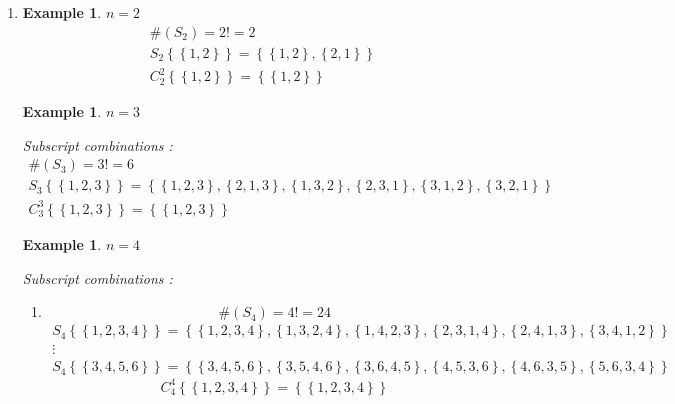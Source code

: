 \documentclass[aps,preprint]{revtex4}%
\newtheorem{example}[theorem]{Example}
\begin{document}
\begin{enumerate}
\item
\begin{example}
$n=2$%
\begin{gather}
\#\left(  S_{2}\right)  =2!=2\\
S_{2}\left\{  \left\{  1,2\right\}  \right\}  =\left\{  \left\{  1,2\right\}
,\left\{  2,1\right\}  \right\} \\
C_{2}^{2}\left\{  \left\{  1,2\right\}  \right\}  =\left\{  \left\{
1,2\right\}  \right\}
\end{gather}

\end{example}

\begin{example}
$n=3$

Subscript combinations :%
\begin{gather}
\#\left(  S_{3}\right)  =3!=6\\
S_{3}\left\{  \left\{  1,2,3\right\}  \right\}  =\left\{  \left\{
1,2,3\right\}  ,\left\{  2,1,3\right\}  ,\left\{  1,3,2\right\}  ,\left\{
2,3,1\right\}  ,\left\{  3,1,2\right\}  ,\left\{  3,2,1\right\}  \right\} \\
C_{3}^{3}\left\{  \left\{  1,2,3\right\}  \right\}  =\left\{  \left\{
1,2,3\right\}  \right\}
\end{gather}

\end{example}

\begin{example}
$n=4$

Subscript combinations :

\begin{enumerate}
\item
\begin{equation}
\#\left(  S_{4}\right)  =4!=24
\end{equation}%
\begin{gather}
S_{4}\left\{  \left\{  1,2,3,4\right\}  \right\}  =\left\{  \left\{
1,2,3,4\right\}  ,\left\{  1,3,2,4\right\}  ,\left\{  1,4,2,3\right\}
,\left\{  2,3,1,4\right\}  ,\left\{  2,4,1,3\right\}  ,\left\{
3,4,1,2\right\}  \right\} \\
\vdots\\
S_{4}\left\{  \left\{  3,4,5,6\right\}  \right\}  =\left\{  \left\{
3,4,5,6\right\}  ,\left\{  3,5,4,6\right\}  ,\left\{  3,6,4,5\right\}
,\left\{  4,5,3,6\right\}  ,\left\{  4,6,3,5\right\}  ,\left\{
5,6,3,4\right\}  \right\}
\end{gather}%
\begin{equation}
C_{4}^{4}\left\{  \left\{  1,2,3,4\right\}  \right\}  =\left\{  \left\{
1,2,3,4\right\}  \right\}
\end{equation}



\end{enumerate}
\end{example}
\end{enumerate}
\end{document}
